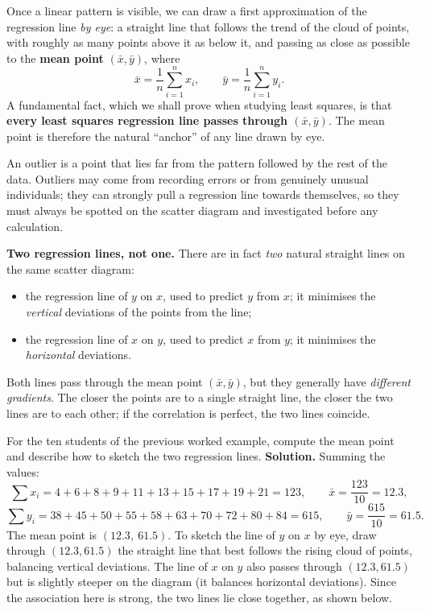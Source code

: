 \documentclass[11pt]{article}
\newcommand{\cle}[1]{{\popxbold\color{popdark}#1}}
\begin{document}
Once a linear pattern is visible, we can draw a first approximation of the regression line \emph{by eye}: a straight line that follows the trend of the cloud of points, with roughly as many points above it as below it, and passing as close as possible to the \textbf{mean point} $(\bar{x}, \bar{y})$, where
\[
\bar{x} = \frac{1}{n}\sum_{i=1}^{n} x_i, \qquad \bar{y} = \frac{1}{n}\sum_{i=1}^{n} y_i.
\]
A fundamental fact, which we shall prove when studying least squares, is that \textbf{every least squares regression line passes through $(\bar{x}, \bar{y})$}. The mean point is therefore the natural ``anchor'' of any line drawn by eye.

\begin{definition}[Outlier]
An \cle{outlier} is a point that lies far from the pattern followed by the rest of the data. Outliers may come from recording errors or from genuinely unusual individuals; they can strongly pull a regression line towards themselves, so they must always be spotted on the scatter diagram and investigated before any calculation.
\end{definition}

\textbf{Two regression lines, not one.} There are in fact \emph{two} natural straight lines on the same scatter diagram:
\begin{itemize}
\item the \cle{regression line of $y$ on $x$}, used to predict $y$ from $x$; it minimises the \emph{vertical} deviations of the points from the line;
\item the \cle{regression line of $x$ on $y$}, used to predict $x$ from $y$; it minimises the \emph{horizontal} deviations.
\end{itemize}
Both lines pass through the mean point $(\bar{x}, \bar{y})$, but they generally have \emph{different gradients}. The closer the points are to a single straight line, the closer the two lines are to each other; if the correlation is perfect, the two lines coincide.

\begin{exoresolu}
For the ten students of the previous worked example, compute the mean point and describe how to sketch the two regression lines.
\tcblower
\textbf{Solution.} Summing the values:
\[
\sum x_i = 4+6+8+9+11+13+15+17+19+21 = 123, \qquad \bar{x} = \frac{123}{10} = 12.3,
\]
\[
\sum y_i = 38+45+50+55+58+63+70+72+80+84 = 615, \qquad \bar{y} = \frac{615}{10} = 61.5.
\]
The mean point is $(12.3,\ 61.5)$. To sketch the line of $y$ on $x$ by eye, draw through $(12.3, 61.5)$ the straight line that best follows the rising cloud of points, balancing vertical deviations. The line of $x$ on $y$ also passes through $(12.3, 61.5)$ but is slightly steeper on the diagram (it balances horizontal deviations). Since the association here is strong, the two lines lie close together, as shown below.
\end{exoresolu}
\end{document}
